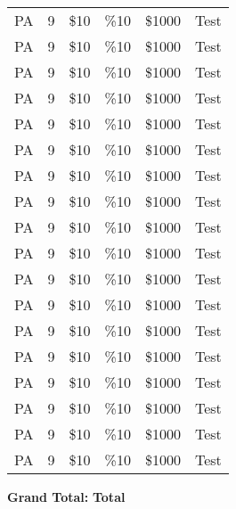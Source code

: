 \documentclass{article}%
\begin{document}
\begin{longtabu}{X[r] X[r] X[r] X[r] X[r] X[r]}
PA&9&\$10&\%10&\$1000&Test\\%
PA&9&\$10&\%10&\$1000&Test\\%
PA&9&\$10&\%10&\$1000&Test\\%
PA&9&\$10&\%10&\$1000&Test\\%
PA&9&\$10&\%10&\$1000&Test\\%
PA&9&\$10&\%10&\$1000&Test\\%
PA&9&\$10&\%10&\$1000&Test\\%
PA&9&\$10&\%10&\$1000&Test\\%
PA&9&\$10&\%10&\$1000&Test\\%
PA&9&\$10&\%10&\$1000&Test\\%
PA&9&\$10&\%10&\$1000&Test\\%
PA&9&\$10&\%10&\$1000&Test\\%
PA&9&\$10&\%10&\$1000&Test\\%
PA&9&\$10&\%10&\$1000&Test\\%
PA&9&\$10&\%10&\$1000&Test\\%
PA&9&\$10&\%10&\$1000&Test\\%
PA&9&\$10&\%10&\$1000&Test\\%
PA&9&\$10&\%10&\$1000&Test\\%
\end{longtabu}%
\textbf{Grand Total:}%
\hfill%
\textbf{Total}%
\end{document}
